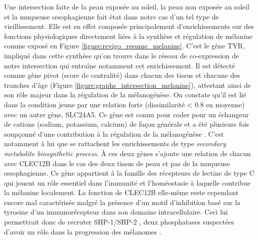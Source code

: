Une intersection faite de la peau exposée au soleil, la peau non exposée au soleil et la muqueuse œsophagienne fait état dans notre cas d'un tel type de vieillissement. 
Elle est en effet composée principalement d'enrichissements sur des fonctions physiologiques directement liées à la synthèse et régulation de mélanine comme exposé en Figure \ref{figure:revigo_resume_melanine}. 
C'est le gène TYR, impliqué dans cette synthèse qu'on trouve dans le réseau de co-expression de notre intersection qui entraîne notamment cet enrichissement. Il est détecté comme gène pivot (score de centralité) dans chacun des tissus et chacune des tranches d'âge (Figure \ref{figure:graphs_intersection_melanine}), attestant ainsi de son rôle majeur dans la régulation de la mélanogénèse. On constate qu'il est lié dans la condition jeune par une relation forte (dissimilarité < 0.8 en moyenne) avec un autre gène, SLC24A5. Ce gène est connu pour coder pour un échangeur de cations (sodium, potassium, calcium) de façon générale et a été plusieurs fois soupçonné d'une contribution à la régulation de la mélanogénèse . C'est notamment à lui que se rattachent les enrichissements de type \textit{secondary metabolite biosynthetic process}. 
À ces deux gènes s'ajoute une relation de chacun avec CLEC12B dans le cas des deux tissus de peau et pas de la muqueuse œsophagienne. Ce gène appartient à la famille des récepteurs de lectine de type C qui jouent un rôle essentiel dans l'immunité et l'homéostasie à laquelle contribue la mélanine localement. La fonction de CLEC12B elle-même reste cependant encore mal caractérisée malgré la présence d'un motif d'inhibition basé sur la tyrosine d'un immunorécepteur dans son domaine intracellulaire. Ceci lui permettrait donc de recruter SHP-1/SHP-2 , deux phosphatases suspectées d'avoir un rôle dans la progression des mélanomes . 

